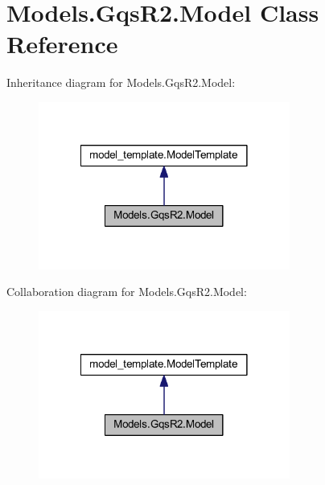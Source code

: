 \hypertarget{class_models_1_1_gqs_r2_1_1_model}{\section{Models.\-Gqs\-R2.\-Model Class Reference}
\label{class_models_1_1_gqs_r2_1_1_model}
}


Inheritance diagram for Models.\-Gqs\-R2.\-Model\-:
\nopagebreak
\begin{figure}[H]
\begin{center}
\leavevmode
\includegraphics[width=234pt]{class_models_1_1_gqs_r2_1_1_model__inherit__graph}
\end{center}
\end{figure}


Collaboration diagram for Models.\-Gqs\-R2.\-Model\-:
\nopagebreak
\begin{figure}[H]
\begin{center}
\leavevmode
\includegraphics[width=234pt]{class_models_1_1_gqs_r2_1_1_model__coll__graph}
\end{center}
\end{figure}
